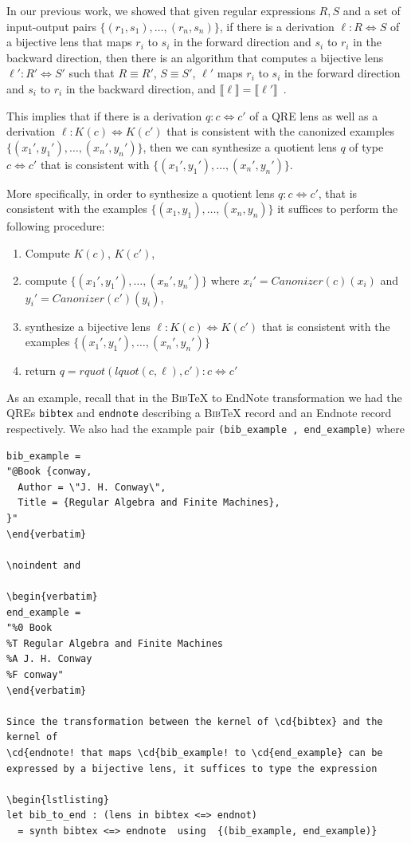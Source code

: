 \documentclass{svproc}
\newcommand{\cd}[1]{\lstinline[backgroundcolor=\color{white}]$#1$}
\newcommand{\canonizer}{\ensuremath{\mathit{Canonizer}}}
\newcommand{\bibtex}{\textsc{Bib}\TeX{}}
\begin{document}
In our previous work, we showed that given regular expressions $R, S$ and a set
of input-output pairs $\{(r_1, s_1), \ldots, (r_n, s_n)\}$, if there is a
derivation $\ell : R \Leftrightarrow S$ of a bijective lens that maps $r_i$ to
$s_i$ in the forward direction and $s_i$ to $r_i$ in the backward direction,
then there is an algorithm that computes a bijective lens $\ell' : R'
\Leftrightarrow S'$ such that $R \equiv R'$, $S \equiv S'$, $\ell'$ maps $r_i$
to $s_i$ in the forward direction and $s_i$ to $r_i$ in the backward direction,
and $\llbracket \ell \rrbracket = \llbracket \ell' \rrbracket$~\cite{popl18}.

This implies that if there is a derivation $q : c \Leftrightarrow
c'$ of a QRE lens as well as a derivation $\ell : K(c) \Leftrightarrow K(c')$
that is consistent with the canonized examples $\{({x_1}', {y_1}'),
\ldots, ({x_n}', {y_n}')\}$, then we can synthesize a quotient lens $q$ of
type $c \Leftrightarrow c'$ that is consistent with $\{({x_1}', {y_1}'),
\ldots, ({x_n}', {y_n}')\}$.

More specifically, in order to synthesize a quotient lens $q: c \Leftrightarrow
c'$, that is consistent with the examples $\{(x_1, y_1), \ldots, (x_n, y_n)\}$
 it suffices to perform the following procedure:
\begin{enumerate}
  \item
  Compute $K(c)$, $K(c')$,
  \item
  compute $\{({x_1}', {y_1}'), \ldots, ({x_n}', {y_n}')\}$ where ${x_i}' =
  \canonizer(c)(x_i)$ and ${y_i}' = \canonizer(c')(y_i)$,
  \item
    synthesize a bijective lens $\ell : K(c) \Leftrightarrow K(c')$ that is
    consistent with the examples $\{({x_1}', {y_1}'), \ldots, ({x_n}',
    {y_n}')\}$
  \item 
  return $q = \mathit{rquot}(\mathit{lquot}(c, \ell), c') : c \Leftrightarrow
  c'$
\end{enumerate}
As an example, recall that
in the \bibtex{} to EndNote transformation we had the QREs \cd{bibtex} and \cd{endnote} describing a \bibtex{} record and an
Endnote record respectively. We also had the example pair 
\cd{(bib_example , end_example)} where

\begin{lstlisting}
bib_example = 
"@Book {conway,
  Author = \"J. H. Conway\",
  Title = {Regular Algebra and Finite Machines},
}"
\end{verbatim}

\noindent and

\begin{verbatim}
end_example = 
"%0 Book
%T Regular Algebra and Finite Machines
%A J. H. Conway
%F conway"
\end{verbatim}

Since the transformation between the kernel of \cd{bibtex} and the kernel of
\cd{endnote! that maps \cd{bib_example! to \cd{end_example} can be
expressed by a bijective lens, it suffices to type the expression

\begin{lstlisting}
let bib_to_end : (lens in bibtex <=> endnot) 
  = synth bibtex <=> endnote  using  {(bib_example, end_example)}
\end{lstlisting}
\end{document}
